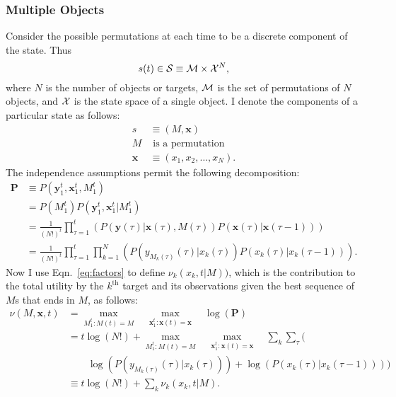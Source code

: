 \documentclass[12pt]{article}
\newcommand{\ti}[2]{{#1}{(#2)}}                         %
\newcommand{\ts}[4]{{#1}_{#3}^{#4}} %
\begin{document}
\subsubsection{Multiple Objects}
\label{sec:multiple}

Consider the possible permutations at each time to be a discrete
component of the state.  Thus
\begin{equation*}
  \ti{s}{t} \in {\cal S} \equiv {\cal M} \times {\cal X}^{N},
\end{equation*}
where $N$ is the number of objects or targets, $\cal M$ is the set of
permutations of $N$ objects, and ${\cal X}$ is the state space of a
single object.  I denote the components of a particular state as
follows:
\newcommand{\bx}{{\mathbf{x}}}
\newcommand{\by}{{\mathbf{y}}}
\begin{align*}
  s &\equiv (M,\bx) \\
  M & \text{ is a permutation} \\
  \bx &\equiv (x_1,x_2,\ldots,x_N).
\end{align*}
The independence assumptions permit the following decomposition:
\begin{align}
  \mathbf{P} &\equiv
  P(\ts{\by}{\tau}{1}{t},\ts{\bx}{\tau}{1}{t},\ts{M}{\tau}{1}{t})
  \nonumber \\
  &= P(\ts{M}{\tau}{1}{t})
  P(\ts{\by}{\tau}{1}{t},\ts{\bx}{\tau}{1}{t}|\ts{M}{\tau}{1}{t})
  \nonumber \\
  &= \frac{1}{(N!)^t} \prod_{\tau=1}^t \left(
    P(\ti{\by}{\tau}|\ti{\bx}{\tau},\ti{M}{\tau})
    P(\ti{\bx}{\tau}|\ti{\bx}{\tau-1}) \right) \nonumber \\
  \label{eq:factors}
  &= \frac{1}{(N!)^t} \prod_{\tau=1}^t  \prod_{k=1}^N \left(
  P(\ti{y_{M_k(\tau)}}{\tau}|\ti{x_k}{\tau})
  P(\ti{x_k}{\tau}|\ti{x_k}{\tau-1}) \right).
\end{align}
\newcommand{\mmm}{\max_{\ts{M}{\tau}{1}{t}:\ti{M}{t}=M}}
\newcommand{\mxx}{\max_{\ts{\bx}{\tau}{1}{t}:\ti{\bx}{t}=\bx}} Now I
use Eqn.~\eqref{eq:factors} to define $\nu_k(x_k,t|M))$, which is the
contribution to the total utility by the $k^{\text{th}}$ target and
its observations given the best sequence of $M$s that ends in $M$, as
follows:
\begin{align*}
  \nu(M,\bx,t) &= \mmm \quad \mxx \quad \log(\mathbf{P})\\
  &= t\log(N!) + \mmm \quad \mxx \quad \sum_k \sum_\tau \Big(\\
  & \quad \quad \log(P(\ti{y_{M_k(\tau)}}{\tau}|\ti{x_k}{\tau})) +
  \log( P(\ti{x_k}{\tau}|\ti{x_k}{\tau-1}) ) \Big) \\
  & \equiv t\log(N!) + \sum_k \nu_k(x_k,t|M).
\end{align*}
\end{document}

